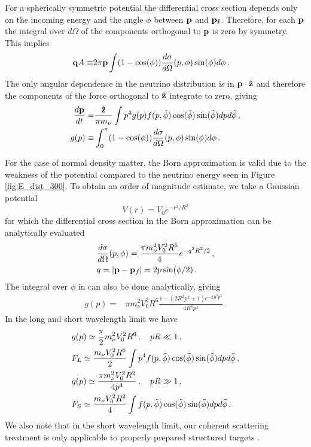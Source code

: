 For a spherically symmetric potential the differential cross section depends only on the incoming energy and the angle $\phi$ between ${\bf p}$ and ${\bf p_f}$.  Therefore, for each ${\bf p}$ the integral over $d\Omega$ of the components orthogonal to ${\bf p}$ is zero by symmetry.  This implies
\begin{align}
{\bf q}A\equiv &2\pi{\bf p}\int(1-\cos(\phi))\frac{d\sigma}{ d\Omega}(p,\phi)\sin(\phi)d\phi\,.
\end{align}
The only angular dependence in the neutrino distribution is in ${\bf p}\cdot {\bf\hat z}$ and therefore the components of the force orthogonal to ${\bf \hat z}$ integrate to zero, giving
\begin{align}\label{drag}
\frac{d{\bf p}}{dt}=&\frac{{\bf\hat z}}{\pi m_\nu } \int p^4g(p) f(p,\tilde\phi) \cos(\tilde\phi) \sin(\tilde\phi) dpd\tilde\phi\,,\\
g(p)\equiv& \int_0^\pi(1-\cos(\phi))\frac{d\sigma}{ d\Omega}(p,\phi)\sin(\phi)d\phi\,.\label{geq}
\end{align}

For the case of normal density matter, the Born approximation is valid due to the weakness of the potential compared to the neutrino energy seen in Figure \ref{fig:E_dist_300}. To obtain an order of magnitude estimate, we take a Gaussian potential \begin{equation}
V(r)=V_0e^{-r^2/R^2}
\end{equation}
for which the differential cross section in the Born approximation can be analytically evaluated
\begin{align}
&\frac{d\sigma}{ d\Omega}(p,\phi)=\frac{\pi m_\nu^2V_0^2R^6}{4}e^{-q^2R^2/2}\,,\notag\\
&q=|{\bf p}-{\bf p}_f|=2p\sin(\phi/2)\,.
\end{align}
The integral over $\phi$ in  can also be done analytically, giving
\begin{align}
g(p)=&\pi m_\nu^2V_0^2R^6\frac{1-(2R^2p^2+1)e^{-2R^2p^2}}{4R^4p^4}\,.
\end{align}
 In the long and short wavelength limit we have 
\begin{align}
\label{long_wave_drag}
&g(p)\simeq\frac{\pi}{2} m_\nu^2V_0^2R^6\,,\quad pR\ll 1\,,\\
&F_L\simeq \frac{m_\nu V_0^2R^6}{2} \int p^4 f(p,\tilde\phi) \cos(\tilde\phi) \sin(\tilde\phi) dpd\tilde\phi\,,\notag\\
\label{short_wave_drag}
&g(p)\simeq\frac{\pi m_\nu^2V_0^2R^2}{4p^4}\,, 
\quad pR\gg 1\,,\\
&F_S\simeq \frac{ m_\nu V_0^2R^2}{4} \int f(p,\tilde\phi) \cos(\tilde\phi) \sin(\tilde\phi) dpd\tilde\phi\notag\,.
\end{align}
 We also note that in the short wavelength limit, our coherent scattering treatment is only applicable to properly prepared structured targets \cite{Liao:2012}.

